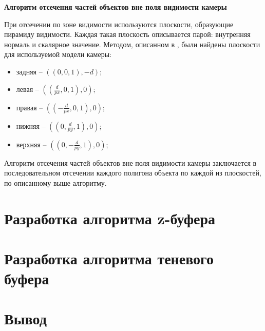 \textbf{Алгоритм отсечения частей объектов вне поля видимости камеры}

При отсечении по зоне видимости используются плоскости, образующие пирамиду видимости. Каждая такая плоскость описывается парой: внутренняя нормаль и скалярное значение. Методом, описанном в \cite{gabriella}, были найдены плоскости для используемой модели камеры:
	
\begin{itemize}
	\item задняя -- $((0, 0, 1), -d)$;
	\item левая -- $((\frac{d}{px}, 0, 1), 0)$;
	\item правая -- $((-\frac{d}{px}, 0, 1), 0)$;
	\item нижняя -- $((0, \frac{d}{py}, 1), 0)$;
	\item верхняя -- $((0, -\frac{d}{py}, 1), 0)$;
\end{itemize}

Алгоритм отсечения частей объектов вне поля видимости камеры заключается в последовательном отсечении каждого полигона объекта по каждой из плоскостей, по описанному выше алгоритму.


\section{Разработка алгоритма z-буфера}

\section{Разработка алгоритма теневого буфера}

\section*{Вывод}

\clearpage
